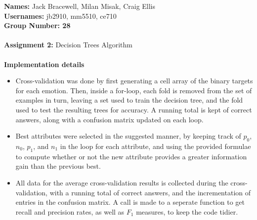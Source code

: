 \documentclass[12pt]{article}
\begin{document}
{\bf Names:} Jack Bracewell, Milan Misak, Craig Ellis \\
{\bf Usernames:} jb2910, mm5510, ce710 \\
{\bf Group Number: 28}  \\ \\

{\bf Assignment 2:} Decision Trees Algorithm \\ \\

{\bf Implementation details} \\
\begin{itemize}
  \item Cross-validation was done by first generating a cell array of the binary targets for each emotion. Then, inside a for-loop, each fold is removed from the set of examples in turn, leaving a set used to train the decision tree, and the fold used to test the resulting trees for accuracy. A running total is kept of correct answers, along with a confusion matrix updated on each loop.
  \item Best attributes were selected in the suggested manner, by keeping track of \( p_0 \), \( n_0 \), \( p_1 \), and \( n_1 \) in the loop for each attribute, and using the provided formulae to compute whether or not the new attribute provides a greater information gain than the previous best.
  \item All data for the average cross-validation results is collected during the cross-validation, with a running total of correct answers, and the incrementation of entries in the confusion matrix. A call is made to a seperate function to get recall and precision rates, as well as \( F_1 \) measures, to keep the code tidier.
\end{itemize}
\end{document}
